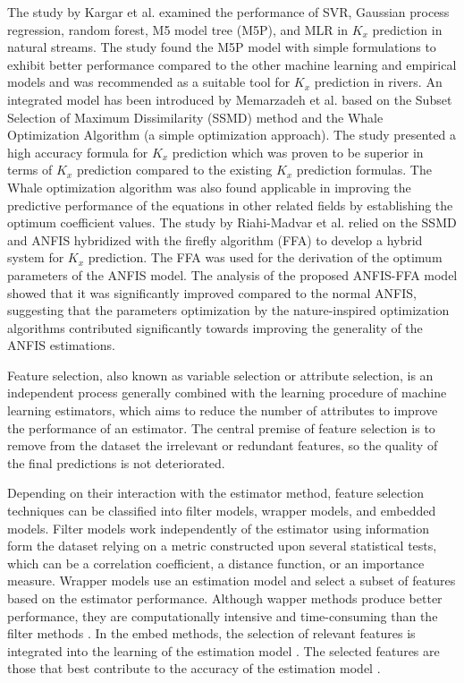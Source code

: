 \documentclass[a4paper,12pt, english]{article}
\begin{document}
The study by Kargar et al. \cite{kargar2020estimating} examined the performance of SVR, Gaussian process regression, random forest, M5 model tree (M5P), and MLR in $K_x$ prediction in natural streams. The study found the M5P model with simple formulations to exhibit better performance compared to the other machine learning and empirical models and was recommended as a suitable tool for $K_x$ prediction in rivers. An integrated model has been introduced by Memarzadeh et al. \cite{memarzadeh2020novel} based on the Subset Selection of Maximum Dissimilarity (SSMD) method and the Whale Optimization Algorithm (a simple optimization approach). The study presented a high accuracy formula for $K_x$ prediction which was proven to be superior in terms of $K_x$ prediction compared to the existing $K_x$ prediction formulas. The Whale optimization algorithm was also found applicable in improving the predictive performance of the equations in other related fields by establishing the optimum coefficient values. The study by Riahi-Madvar et al.\cite{riahi2020improvements} relied on the SSMD and ANFIS hybridized with the firefly algorithm (FFA) to develop a hybrid system for $K_x$ prediction. The FFA was used for the derivation of the optimum parameters of the ANFIS model. The analysis of the proposed ANFIS-FFA model showed that it was significantly improved compared to the normal ANFIS, suggesting that the parameters optimization by the nature-inspired optimization algorithms contributed significantly towards improving the generality of the ANFIS estimations.



{\color{blue}
Feature selection,  also known as variable selection or attribute selection,  is an independent process generally combined with the learning procedure of machine learning estimators, which aims to reduce the number of attributes to improve the performance of an estimator.
The central premise of feature selection is to remove from the dataset the irrelevant or redundant features, so the quality of the final predictions is not deteriorated. 

Depending on their interaction with the estimator method,
feature selection techniques can be classified into filter models,   wrapper models, and embedded models.
%
Filter models work independently of the estimator using information form the dataset relying on a metric constructed upon several statistical tests, which can be a correlation coefficient, a distance function, or an importance measure.
%
Wrapper models use an estimation model and select a subset of features based on the estimator performance. 
Although wapper methods produce better performance, they are computationally intensive and time-consuming than the filter methods \cite{tan:2020}.
%
In the embed methods,
the selection of relevant features is integrated into the learning of the estimation model \cite{cai:201870}. The selected features are those that best contribute to the accuracy of the estimation model \cite{mirzaei:2017}.
}
\end{document}
